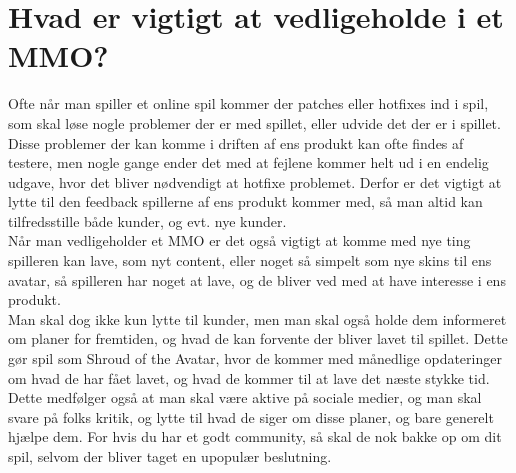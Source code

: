 \cfoot{\page\textbackslash \totalp} %
\chapter{Hvad er vigtigt at vedligeholde i et MMO?}

Ofte når man spiller et online spil kommer der patches eller hotfixes ind i spil, som skal løse nogle problemer der er med spillet, eller udvide det der er i spillet. Disse problemer der kan komme i driften af ens produkt kan ofte findes af testere, men nogle gange ender det med at fejlene kommer helt ud i en endelig udgave, hvor det bliver nødvendigt at hotfixe problemet. Derfor er det vigtigt at lytte til den feedback spillerne af ens produkt kommer med, så man altid kan tilfredsstille både kunder, og evt. nye kunder.\\
Når man vedligeholder et MMO er det også vigtigt at komme med nye ting spilleren kan lave, som nyt content, eller noget så simpelt som nye skins til ens avatar, så spilleren har noget at lave, og de bliver ved med at have interesse i ens produkt.\cite{WoW}\\
Man skal dog ikke kun lytte til kunder, men man skal også holde dem informeret om planer for fremtiden, og hvad de kan forvente der bliver lavet til spillet. Dette gør spil som Shroud of the Avatar\cite{SOTA}, hvor de kommer med månedlige opdateringer om hvad de har fået lavet, og hvad de kommer til at lave det næste stykke tid\cite{SOTAForum}. Dette medfølger også at man skal være aktive på sociale medier, og man skal svare på folks kritik, og lytte til hvad de siger om disse planer, og bare generelt hjælpe dem\cite{GreatMMO}. For hvis du har et godt community, så skal de nok bakke op om dit spil, selvom der bliver taget en upopulær beslutning.\cite{MMOChampion}
